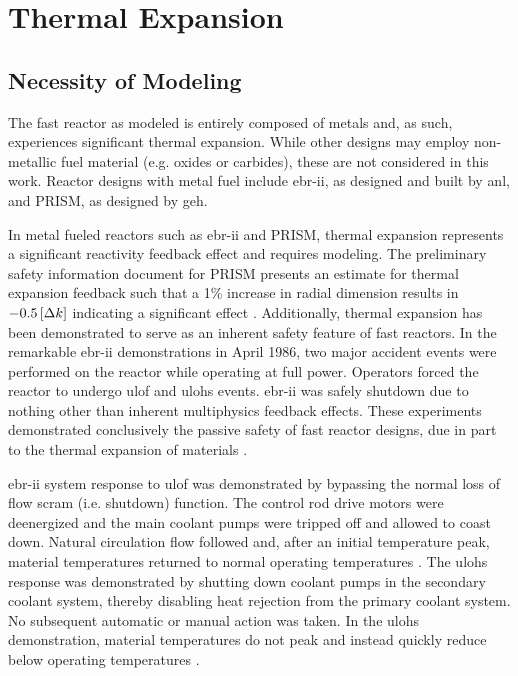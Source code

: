 \chapter{Thermal Expansion}
\label{ch:thermalExpansion}

\section{Necessity of Modeling}
  The fast reactor as modeled is entirely composed of metals and, as such,
  experiences significant thermal expansion. While other designs may employ
  non-metallic fuel material (e.g. oxides or carbides), these are not considered
  in this work. Reactor designs with metal fuel include \gls{ebr-ii}, as
  designed and built by \gls{anl}, and PRISM, as designed by \gls{geh}.

  In metal fueled reactors such as \gls{ebr-ii} and PRISM, thermal expansion
  represents a significant reactivity feedback effect and requires modeling.
  The preliminary safety information document for PRISM presents an estimate for
  thermal expansion feedback such that a 1\% increase in radial dimension
  results in $-0.5 \left[\text{{$\Delta k$}}\right]$ indicating a significant effect
  \cite{GEFR793}. Additionally, thermal expansion has been demonstrated to serve
  as an inherent safety feature of fast reactors. In the remarkable \gls{ebr-ii}
  demonstrations in April 1986, two major accident events were performed on the
  reactor while operating at full power. Operators forced the reactor to undergo
  \gls{ulof} and \gls{ulohs} events. \gls{ebr-ii} was safely shutdown due to
  nothing other than inherent multiphysics feedback effects. These experiments
  demonstrated conclusively the passive safety of fast reactor designs, due in
  part to the thermal expansion of materials \cite{PlentifulEnergy}.

  \gls{ebr-ii} system response to \gls{ulof} was demonstrated by bypassing the
  normal loss of flow scram (i.e. shutdown) function. The control rod drive
  motors were deenergized and the main coolant pumps were tripped off and
  allowed to coast down. Natural circulation flow followed and, after an initial
  temperature peak, material temperatures returned to normal operating
  temperatures \cite{ebriitests}. The \gls{ulohs} response was demonstrated by
  shutting down coolant pumps in the secondary coolant system, thereby disabling
  heat rejection from the primary coolant system. No subsequent automatic or
  manual action was taken. In the \gls{ulohs} demonstration, material
  temperatures do not peak and instead quickly reduce below operating
  temperatures \cite{ebriitests}.

